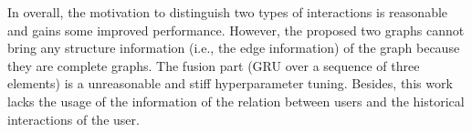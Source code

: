 In overall, the motivation to distinguish two types of interactions is reasonable and gains some improved performance.
However, the proposed two graphs cannot bring any structure information (i.e., the edge information) of the graph because they are complete graphs.
The fusion part (GRU over a sequence of three elements) is a unreasonable and stiff hyperparameter tuning.
Besides, this work lacks the usage of the information of the relation between users and the historical interactions of the user.